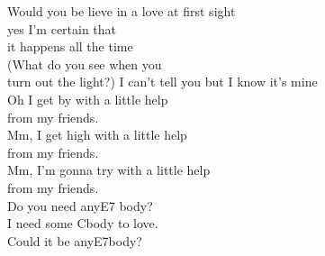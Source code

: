 \begin{enumerate}
\verse {} Would you be lieve in a  love at first sight \\ 
yes I’m certain that \\ 
it  happens all the  time \\ 
(What do you  see when you \\ 
 turn out the light?)
I can’t tell you but I  know it’s  mine \\ 
Oh I get  by with a little  help \\ 
from my  friends. \\ 
Mm, I get  high with a little  help \\ 
from my  friends. \\ 
Mm, I’m gonna  try with a little help \\ 
from my  friends. \\ 
Do you  need anyE7 body? \\ 
I  need some Cbody to  love. \\ 
Could it  be anyE7body?

\end{enumerate}
